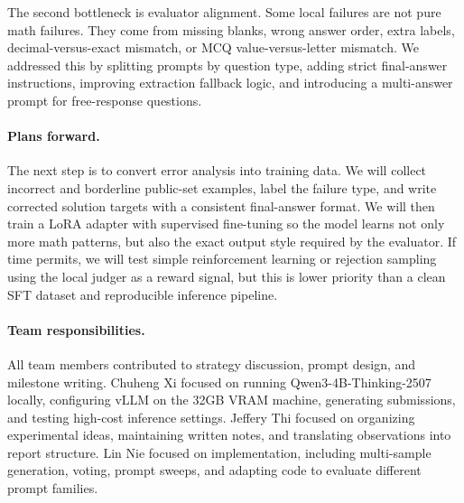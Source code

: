\documentclass{article}
\newcommand{\model}{Qwen3-4B-Thinking-2507}
\begin{document}
The second bottleneck is evaluator alignment. Some local failures are not pure math failures. They come from missing blanks, wrong answer order, extra labels, decimal-versus-exact mismatch, or MCQ value-versus-letter mismatch. We addressed this by splitting prompts by question type, adding strict final-answer instructions, improving extraction fallback logic, and introducing a multi-answer prompt for free-response questions.

\paragraph{Plans forward.}
The next step is to convert error analysis into training data. We will collect incorrect and borderline public-set examples, label the failure type, and write corrected solution targets with a consistent final-answer format. We will then train a LoRA adapter with supervised fine-tuning so the model learns not only more math patterns, but also the exact output style required by the evaluator. If time permits, we will test simple reinforcement learning or rejection sampling using the local judger as a reward signal, but this is lower priority than a clean SFT dataset and reproducible inference pipeline.

\paragraph{Team responsibilities.}
All team members contributed to strategy discussion, prompt design, and milestone writing. Chuheng Xi focused on running \model{} locally, configuring vLLM on the 32GB VRAM machine, generating submissions, and testing high-cost inference settings. Jeffery Thi focused on organizing experimental ideas, maintaining written notes, and translating observations into report structure. Lin Nie focused on implementation, including multi-sample generation, voting, prompt sweeps, and adapting code to evaluate different prompt families.
\end{document}
